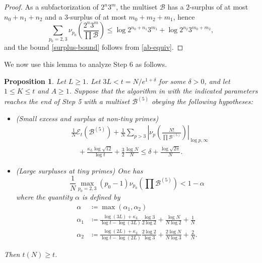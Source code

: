 \documentclass[12pt,a4paper,reqno]{amsart}
\numberwithin{equation}{section}
\theoremstyle{plain}
\newtheorem{proposition}[theorem]{Proposition}
\theoremstyle{definition}
\newcommand\tuple{{\mathcal B}}
\newcommand\excess{{\mathcal{E}}}
\begin{document}
\begin{proof}
  As a subfactorization of $2^n 3^m$, the multiset $\tuple$ has a $2$-surplus of at most $n_0+n_1+n_2$ and a $3$-surplus of at most $m_0+m_2+m_1$, hence
  $$ \sum_{p_0=2,3} \nu_{p_0}\left(\frac{2^n 3^m}{\prod \tuple}\right) \leq \log 2^{n_0+n_1} 3^{m_1} + \log 2^{n_2} 3^{m_0+m_2},$$
  and the bound \eqref{surplus-bound} follows from \eqref{ab-equiv}.
  \end{proof}
  
We now use this lemma to analyze Step 6 as follows.

\begin{proposition}\label{step6-reduce} Let $L \geq 1$.
  Let $3L < t = N/e^{1+\delta}$ for some $\delta>0$, and let $1 \leq K \leq t$ and $A \geq 1$.  Suppose that the algorithm in  with the indicated parameters reaches the end of Step 5 with a multiset $\tuple^{(5)}$ obeying the following hypotheses:
\begin{itemize}
  \item[(i)] (Small excess and surplus at non-tiny primes)
  \begin{equation}\label{new-balance-3}
  \begin{split}
    &\frac{1}{N} \excess_t(\tuple^{(5)}) + \frac{1}{N} \sum_{p>3} \left|\nu_p\left(\frac{N!}{\prod \tuple^{(5)}}\right)\right|_{\log p,\infty}  \\
    &\quad + \frac{\kappa_L \log \sqrt{12}}{\log t} + \frac{3}{2} \frac{\log N}{N} \leq \delta + \frac{\log \sqrt{2\pi}}{N}.
  \end{split}
  \end{equation}
  \item[(ii)] (Large surpluses at tiny primes) One has
\begin{equation}\label{qn} 
\frac{1}{N} \max_{p_0=2,3} (p_0-1) \nu_{p_0}\left(\prod \tuple^{(5)}\right) < 1-\alpha
\end{equation}
where the quantity $\alpha$ is defined by
\begin{equation}\label{qntl} 
  \begin{split}
\alpha &\coloneqq \max(\alpha_1,\alpha_2) \\
\alpha_1 &\coloneqq \frac{\log(3L)+\kappa_L}{\log t - \log(3L)} \frac{\log 3}{2 \log 2} + \frac{\log N}{N \log 2} + \frac{1}{N} \\
\alpha_2 &\coloneqq \frac{\log(2L)+\kappa_L}{\log t - \log(2L)} \frac{2\log 2}{\log 3} + \frac{2\log N}{N \log 3} + \frac{2}{N}.
  \end{split}
\end{equation}
\end{itemize}
Then $t(N) \geq t$.
\end{proposition}
\end{document}
